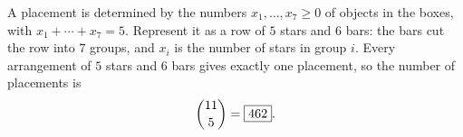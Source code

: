 A placement is determined by the numbers $x_1,\dots,x_7\ge0$ of objects in the boxes, with $x_1+\cdots+x_7=5$. Represent it as a row of $5$ stars and $6$ bars: the bars cut the row into $7$ groups, and $x_i$ is the number of stars in group $i$. Every arrangement of $5$ stars and $6$ bars gives exactly one placement, so the number of placements is
\[
\dbinom{11}{5}=\boxed{462}.
\]
